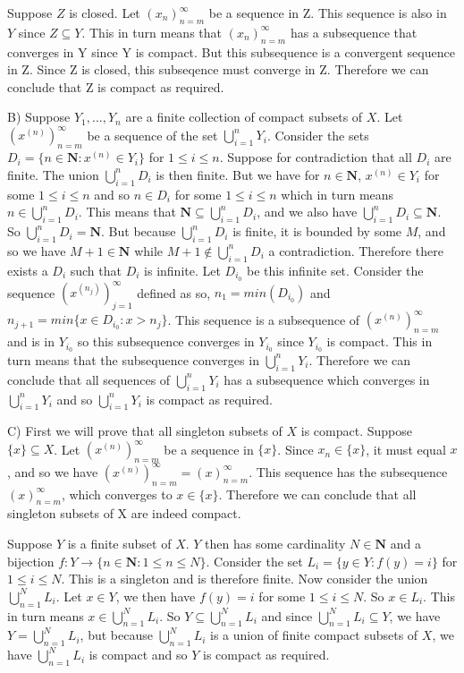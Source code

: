 \documentclass[12pt]{article}
\begin{document}
Suppose $Z$ is closed. Let $(x_n)^\infty_{n=m}$ be a sequence in Z. This sequence is also in $Y$ since $Z\subseteq Y$. This in turn means that $(x_n)^\infty_{n=m}$ has a subsequence that converges in Y since Y is compact. But this subsequence is a convergent sequence in Z. Since Z is closed, this subseqence must converge in Z. Therefore we can conclude that Z is compact as required. 

B) Suppose $Y_1,..., Y_n$ are a finite collection of compact subsets of $X$. Let $(x^{(n)})^\infty_{n=m}$ be a sequence of the set $\bigcup^n_{i=1}Y_i$. Consider the sets $D_i = \{n\in \textbf{N}: x^{(n)}\in Y_i\}$ for $1\leq i\leq n$. Suppose for contradiction that all $D_i$ are finite. The union $\bigcup^n_{i=1}D_i$ is then finite. But we have for $n\in \textbf{N}$, $x^{(n)}\in Y_i$ for some $1\leq i\leq n$ and so $n\in D_i$ for some $1\leq i\leq n$ which in turn means $n\in \bigcup^n_{i=1}D_i$. This means that $\textbf{N}\subseteq\bigcup^n_{i=1}D_i$, and we also have $\bigcup^n_{i=1}D_i\subseteq\textbf{N} $. So $\bigcup^n_{i=1}D_i =\textbf{N}$. But because $\bigcup^n_{i=1}D_i$ is finite, it is bounded by some $M$, and so we have $M+1\in \textbf{N}$ while $M+1 \notin \bigcup^n_{i=1}D_i$ a contradiction. Therefore there exists a $D_i$ such that $D_i$ is infinite. Let $D_{i_0}$ be this infinite set. Consider the sequence $(x^{(n_j)})_{j=1}^\infty$ defined as so, $n_1 = min(D_{i_0})$ and $n_{j+1} = min\{x\in D_{i_0}: x>n_{j}\}$. This sequence is a subsequence of $(x^{(n)})^\infty_{n=m}$ and is in $Y_{i_0}$ so this subsequence converges in $Y_{i_0}$ since $Y_{i_0}$ is compact. This in turn means that the subsequence converges in $\bigcup^n_{i=1}Y_i$. Therefore we can conclude that all sequences of $\bigcup^n_{i=1}Y_i$ has a subsequence which converges in $\bigcup^n_{i=1}Y_i$ and so $\bigcup^n_{i=1}Y_i$ is compact as required. 

C) First we will prove that all singleton subsets of $X$ is compact. Suppose $\{x\}\subseteq X$. Let $(x^{(n)})^\infty_{n=m}$ be a sequence in $\{x\}$. Since $x_n\in \{x\}$, it must equal $x$, and so we have $(x^{(n)})^\infty_{n=m}=(x)^\infty_{n=m}$. This sequence has the subsequence $(x)^\infty_{n=m}$, which converges to $x\in  \{x\}$. Therefore we can conclude that all singleton subsets of X are indeed compact.

Suppose $Y$ is a finite subset of $X$. $Y$ then has some cardinality $N\in \textbf{N}$ and a bijection $f:Y \to \{n\in \textbf{N}: 1\leq n\leq N\}$. Consider the set $L_i = \{y\in Y:f(y)=i\}$ for $1\leq i\leq N$. This is a singleton and is therefore finite. Now consider the union $\bigcup_{n=1}^N L_i$. Let $x\in Y$, we then have $f(y) = i$ for some $1\leq i\leq N$. So $x\in L_i$. This in turn means $x\in \bigcup_{n=1}^N L_i$. So $Y\subseteq \bigcup_{n=1}^N L_i$ and since $\bigcup_{n=1}^N L_i\subseteq Y$, we have $Y=\bigcup_{n=1}^N L_i$, but because $\bigcup_{n=1}^N L_i$ is a union of finite compact subsets of $X$, we have $\bigcup_{n=1}^N L_i$ is compact and so $Y$ is compact as required. 
\end{document}
